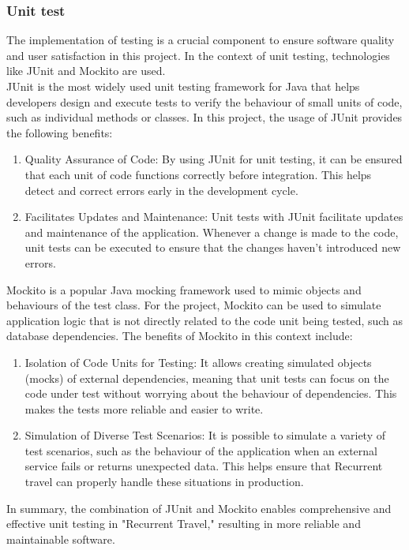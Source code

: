 \documentclass[../memory.tex]{subfiles}
\begin{document}
\subsubsection{Unit test}
The implementation of testing is a crucial component to ensure software quality
and user satisfaction in this project. In the context of unit testing,
technologies like JUnit and Mockito are used.
\\[8pt]
JUnit is the most widely used unit testing framework for Java that helps
developers design and execute tests to verify the behaviour of small units of
code, such as individual methods or classes. In this project, the usage of JUnit
provides the following benefits:
\begin{enumerate}[label = -]
	\item Quality Assurance of Code: By using JUnit for unit testing, it can be
	      ensured that each unit of code functions correctly before integration. This
	      helps detect and correct errors early in the development cycle.
	\item Facilitates Updates and Maintenance: Unit tests with JUnit facilitate
	      updates and maintenance of the application. Whenever a change is made to the
	      code, unit tests can be executed to ensure that the changes haven't
	      introduced new errors.
\end{enumerate}
Mockito is a popular Java mocking framework used to mimic objects and
behaviours of the test class. For the project, Mockito can be used to
simulate application logic that is not directly related to the code unit
being tested, such as database dependencies. The benefits of Mockito in this
context include:
\begin{enumerate}[label = -]
	\item Isolation of Code Units for Testing: It allows creating simulated
	      objects (mocks) of external dependencies, meaning that unit tests can focus
	      on the code under test without worrying about the behaviour of dependencies.
	      This makes the tests more reliable and easier to write.
	\item Simulation of Diverse Test Scenarios: It is possible to simulate a
	      variety of test scenarios, such as the behaviour of the application when an
	      external service fails or returns unexpected data. This helps ensure that
	      Recurrent travel can properly handle these situations in production.
\end{enumerate}
In summary, the combination of JUnit and Mockito enables comprehensive and
effective unit testing in "Recurrent Travel," resulting in more reliable and
maintainable software.
\end{document}
